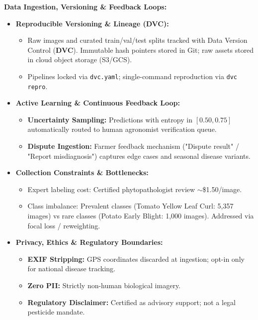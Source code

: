 \documentclass[8pt]{article}
\begin{document}
\begin{minipage}[t]{0.327\linewidth}%
  \begin{tcolorbox}[
    canvasbox,
    colback=bgData,
    colframe=headData,
    title={3. DATA COLLECTION \& GOVERNANCE},
    boxed title style={colback=headData},
    height=68mm
  ]
  \fontsize{7.2pt}{8.8pt}\selectfont
  \textbf{Data Ingestion, Versioning \& Feedback Loops:}
  \vspace{1mm}
  \begin{itemize}
    \item \textbf{Reproducible Versioning \& Lineage (DVC):}
      \begin{itemize}
        \item Raw images and curated train/val/test splits tracked with Data Version Control (\textbf{DVC}). Immutable hash pointers stored in Git; raw assets stored in cloud object storage (S3/GCS).
        \item Pipelines locked via \texttt{dvc.yaml}; single-command reproduction via \texttt{dvc repro}.
      \end{itemize}
    \item \textbf{Active Learning \& Continuous Feedback Loop:}
      \begin{itemize}
        \item \textbf{Uncertainty Sampling:} Predictions with entropy in $[0.50, 0.75]$ automatically routed to human agronomist verification queue.
        \item \textbf{Dispute Ingestion:} Farmer feedback mechanism ("Dispute result" / "Report misdiagnosis") captures edge cases and seasonal disease variants.
      \end{itemize}
    \item \textbf{Collection Constraints \& Bottlenecks:}
      \begin{itemize}
        \item Expert labeling cost: Certified phytopathologist review $\sim$\$1.50/image.
        \item Class imbalance: Prevalent classes (Tomato Yellow Leaf Curl: 5,357 images) vs rare classes (Potato Early Blight: 1,000 images). Addressed via focal loss / reweighting.
      \end{itemize}
    \item \textbf{Privacy, Ethics \& Regulatory Boundaries:}
      \begin{itemize}
        \item \textbf{EXIF Stripping:} GPS coordinates discarded at ingestion; opt-in only for national disease tracking.
        \item \textbf{Zero PII:} Strictly non-human biological imagery.
        \item \textbf{Regulatory Disclaimer:} Certified as advisory support; not a legal pesticide mandate.
      \end{itemize}
  \end{itemize}
  \end{tcolorbox}%
\end{minipage}%
\end{document}
